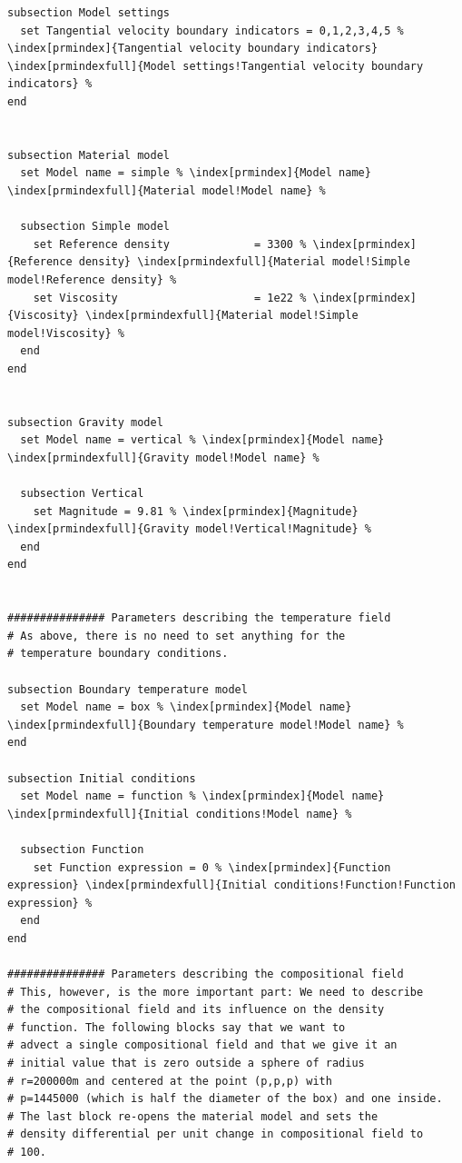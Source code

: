 \documentclass{article}
\begin{document}
\begin{lstlisting}[frame=single,language=prmfile,escapechar=\%]
subsection Model settings
  set Tangential velocity boundary indicators = 0,1,2,3,4,5 % \index[prmindex]{Tangential velocity boundary indicators} \index[prmindexfull]{Model settings!Tangential velocity boundary indicators} %
end


subsection Material model
  set Model name = simple % \index[prmindex]{Model name} \index[prmindexfull]{Material model!Model name} %

  subsection Simple model
    set Reference density             = 3300 % \index[prmindex]{Reference density} \index[prmindexfull]{Material model!Simple model!Reference density} %
    set Viscosity                     = 1e22 % \index[prmindex]{Viscosity} \index[prmindexfull]{Material model!Simple model!Viscosity} %
  end
end


subsection Gravity model
  set Model name = vertical % \index[prmindex]{Model name} \index[prmindexfull]{Gravity model!Model name} %

  subsection Vertical
    set Magnitude = 9.81 % \index[prmindex]{Magnitude} \index[prmindexfull]{Gravity model!Vertical!Magnitude} %
  end
end


############### Parameters describing the temperature field
# As above, there is no need to set anything for the
# temperature boundary conditions.

subsection Boundary temperature model
  set Model name = box % \index[prmindex]{Model name} \index[prmindexfull]{Boundary temperature model!Model name} %
end

subsection Initial conditions
  set Model name = function % \index[prmindex]{Model name} \index[prmindexfull]{Initial conditions!Model name} %

  subsection Function
    set Function expression = 0 % \index[prmindex]{Function expression} \index[prmindexfull]{Initial conditions!Function!Function expression} %
  end
end

############### Parameters describing the compositional field
# This, however, is the more important part: We need to describe
# the compositional field and its influence on the density
# function. The following blocks say that we want to
# advect a single compositional field and that we give it an
# initial value that is zero outside a sphere of radius
# r=200000m and centered at the point (p,p,p) with
# p=1445000 (which is half the diameter of the box) and one inside.
# The last block re-opens the material model and sets the
# density differential per unit change in compositional field to
# 100.


\end{lstlisting}
\end{document}
